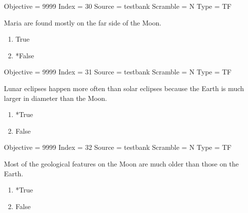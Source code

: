 \documentclass[11pt]{article}
\begin{document}
\begin{enumerate}
\begin{minipage}{\textwidth}
\begin{minipage}{\textwidth}
Objective = 9999
Index = 30
Source = testbank
Scramble = N
Type = TF
\end{minipage}
\end{minipage}
\vskip 0.20in

\begin{minipage}{\textwidth}
\begin{minipage}{\textwidth}
\item Maria are found mostly on the far side of the Moon.
\begin{multicols}{3}
\begin{enumerate} 
\setlength{\itemsep}{1pt} 
\setlength{\parskip}{0pt} 
\setlength{\parsep}{0pt}
\setlength{\multicolsep}{1pt} 
\item True
\item *False
\end{enumerate} 
\vfill 
\end{multicols}

Objective = 9999
Index = 31
Source = testbank
Scramble = N
Type = TF
\end{minipage}
\end{minipage}
\vskip 0.20in

\begin{minipage}{\textwidth}
\begin{minipage}{\textwidth}
\item Lunar eclipses happen more often than solar eclipses because the Earth is much larger in diameter than the Moon.
\begin{multicols}{3}
\begin{enumerate} 
\setlength{\itemsep}{1pt} 
\setlength{\parskip}{0pt} 
\setlength{\parsep}{0pt}
\setlength{\multicolsep}{1pt} 
\item *True
\item False
\end{enumerate} 
\vfill 
\end{multicols}

Objective = 9999
Index = 32
Source = testbank
Scramble = N
Type = TF
\end{minipage}
\end{minipage}
\vskip 0.20in

\begin{minipage}{\textwidth}
\begin{minipage}{\textwidth}
\item Most of the geological features on the Moon are much older than those on the Earth.
\begin{multicols}{3}
\begin{enumerate} 
\setlength{\itemsep}{1pt} 
\setlength{\parskip}{0pt} 
\setlength{\parsep}{0pt}
\setlength{\multicolsep}{1pt} 
\item *True
\item False
\end{enumerate} 
\vfill 
\end{multicols}


\end{minipage}
\end{minipage}
\end{enumerate}
\end{document}
